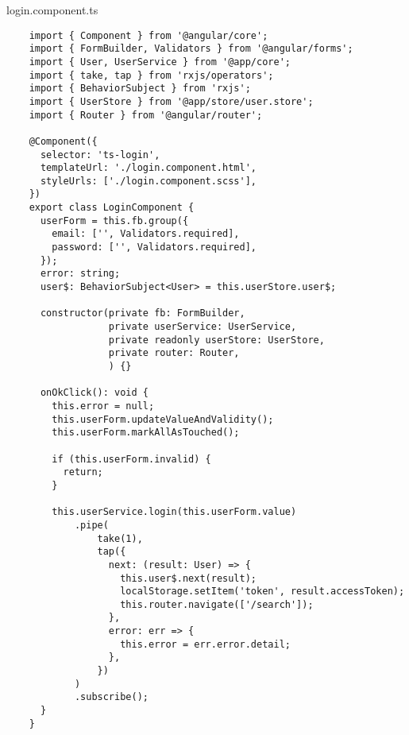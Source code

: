 login.component.ts
\lstset{style=ts}
\begin{lstlisting}
    import { Component } from '@angular/core';
    import { FormBuilder, Validators } from '@angular/forms';
    import { User, UserService } from '@app/core';
    import { take, tap } from 'rxjs/operators';
    import { BehaviorSubject } from 'rxjs';
    import { UserStore } from '@app/store/user.store';
    import { Router } from '@angular/router';
    
    @Component({
      selector: 'ts-login',
      templateUrl: './login.component.html',
      styleUrls: ['./login.component.scss'],
    })
    export class LoginComponent {
      userForm = this.fb.group({
        email: ['', Validators.required],
        password: ['', Validators.required],
      });
      error: string;
      user$: BehaviorSubject<User> = this.userStore.user$;
    
      constructor(private fb: FormBuilder,
                  private userService: UserService,
                  private readonly userStore: UserStore,
                  private router: Router,
                  ) {}
    
      onOkClick(): void {
        this.error = null;
        this.userForm.updateValueAndValidity();
        this.userForm.markAllAsTouched();
    
        if (this.userForm.invalid) {
          return;
        }
    
        this.userService.login(this.userForm.value)
            .pipe(
                take(1),
                tap({
                  next: (result: User) => {
                    this.user$.next(result);
                    localStorage.setItem('token', result.accessToken);
                    this.router.navigate(['/search']);
                  },
                  error: err => {
                    this.error = err.error.detail;
                  },
                })
            )
            .subscribe();
      }
    }    
\end{lstlisting}


